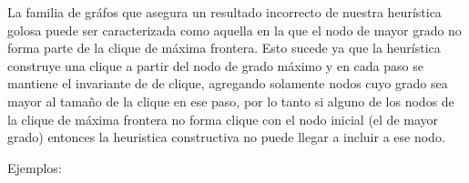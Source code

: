 La familia de gr\'afos que asegura un resultado incorrecto de nuestra 
heur\'istica golosa puede ser caracterizada como aquella en la que el
nodo de mayor grado no forma parte de la clique de m\'axima frontera.
Esto sucede ya que la heur\'istica construye una clique a partir del 
nodo de grado m\'aximo y en cada paso se mantiene el invariante de 
de clique, agregando solamente nodos cuyo grado sea mayor al tama\~no
de la clique en ese paso, por lo tanto si alguno de los nodos de la 
clique de m\'axima frontera no forma clique con el nodo 
inicial (el de mayor grado) entonces la heuristica constructiva no 
puede llegar a incluir a ese nodo.

Ejemplos:

%
%
%
	
